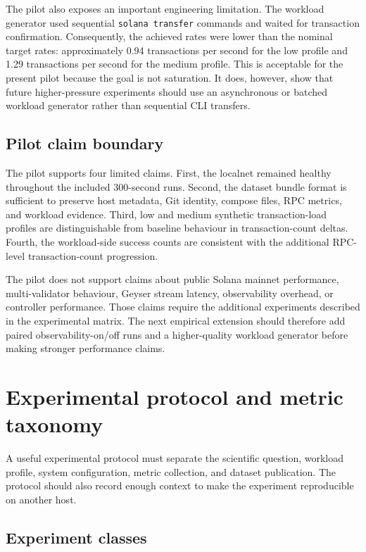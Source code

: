 \documentclass[11pt,a4paper]{article}
\begin{document}
The pilot also exposes an important engineering limitation. The workload generator used sequential \texttt{solana transfer} commands and waited for transaction confirmation. Consequently, the achieved rates were lower than the nominal target rates: approximately 0.94 transactions per second for the low profile and 1.29 transactions per second for the medium profile. This is acceptable for the present pilot because the goal is not saturation. It does, however, show that future higher-pressure experiments should use an asynchronous or batched workload generator rather than sequential CLI transfers.

\subsection{Pilot claim boundary}
\label{subsec:pilot-claim-boundary}

The pilot supports four limited claims. First, the localnet remained healthy throughout the included 300-second runs. Second, the dataset bundle format is sufficient to preserve host metadata, Git identity, compose files, RPC metrics, and workload evidence. Third, low and medium synthetic transaction-load profiles are distinguishable from baseline behaviour in transaction-count deltas. Fourth, the workload-side success counts are consistent with the additional RPC-level transaction-count progression.

The pilot does not support claims about public Solana mainnet performance, multi-validator behaviour, Geyser stream latency, observability overhead, or controller performance. Those claims require the additional experiments described in the experimental matrix. The next empirical extension should therefore add paired observability-on/off runs and a higher-quality workload generator before making stronger performance claims.

\section{Experimental protocol and metric taxonomy}
\label{sec:protocol}

A useful experimental protocol must separate the scientific question, workload profile, system configuration, metric collection, and dataset publication. The protocol should also record enough context to make the experiment reproducible on another host.

\subsection{Experiment classes}
\label{subsec:experiment-classes}
\end{document}
